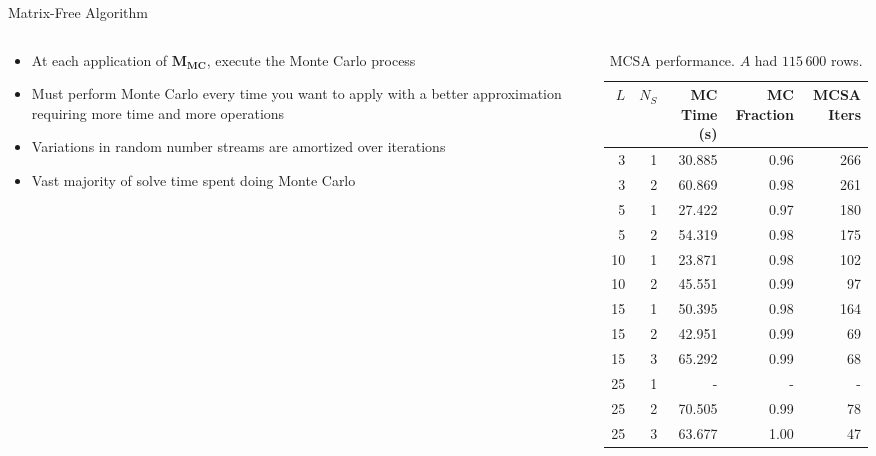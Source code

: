 \documentclass{beamer}
\begin{document}
\begin{frame}{Matrix-Free Algorithm}

  \begin{columns}
    
    \begin{column}{0.4\textwidth}
      
      \begin{itemize}
        \small
      \item At each application of $\mathbf{M_{MC}}$, execute the Monte
        Carlo process
        \vfill
      \item Must perform Monte Carlo every time you want to apply with a better
        approximation requiring more time and more operations
        \vfill
      \item Variations in random number streams are amortized over iterations
        \vfill
      \item Vast majority of solve time spent doing Monte Carlo
      \end{itemize}

    \end{column}

    \begin{column}{0.6\textwidth}
      \begin{table}[htb!]
        \tiny
        \begin{center}
          \begin{tabular}{rrrrr}
            \toprule
            \multicolumn{1}{r}{$L$} &
            \multicolumn{1}{r}{$N_S$} &
            \multicolumn{1}{r}{MC Time (s)} &
            \multicolumn{1}{r}{MC Fraction} &
            \multicolumn{1}{r}{MCSA Iters}
            \\ \midrule
            3 & 1 & 30.885 & 0.96 & 266 \\
            3 & 2 & 60.869 & 0.98 & 261 \\
            5 & 1 & 27.422 & 0.97 & 180 \\
            5 & 2 & 54.319 & 0.98 & 175 \\
            10 & 1 & 23.871 & 0.98 & 102 \\
            10 & 2 & 45.551 & 0.99 & 97 \\
            15 & 1 & 50.395 & 0.98 & 164 \\
            15 & 2 & 42.951 & 0.99 & 69 \\
            15 & 3 & 65.292 & 0.99 & 68 \\
            25 & 1 & - & - & - \\
            25 & 2 & 70.505 & 0.99 & 78 \\
            25 & 3 & 63.677 & 1.00 & 47 \\
            \bottomrule
          \end{tabular}
        \end{center}
        \caption{\small MCSA performance. $A$ had $115\,600$ rows.}
      \end{table} 


\end{column}
\end{columns}
\end{frame}
\end{document}
